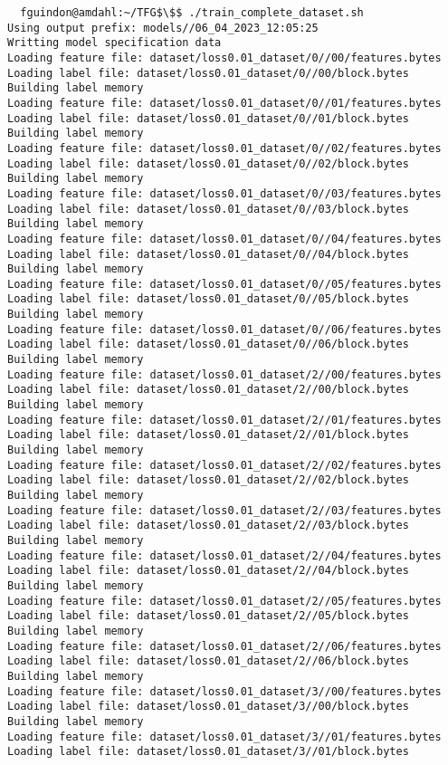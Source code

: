 \documentclass[12pt,oneside]{book}
\begin{document}
\begin{lstlisting}
  fguindon@amdahl:~/TFG$\$$ ./train_complete_dataset.sh
Using output prefix: models//06_04_2023_12:05:25
Writting model specification data
Loading feature file: dataset/loss0.01_dataset/0//00/features.bytes
Loading label file: dataset/loss0.01_dataset/0//00/block.bytes
Building label memory
Loading feature file: dataset/loss0.01_dataset/0//01/features.bytes
Loading label file: dataset/loss0.01_dataset/0//01/block.bytes
Building label memory
Loading feature file: dataset/loss0.01_dataset/0//02/features.bytes
Loading label file: dataset/loss0.01_dataset/0//02/block.bytes
Building label memory
Loading feature file: dataset/loss0.01_dataset/0//03/features.bytes
Loading label file: dataset/loss0.01_dataset/0//03/block.bytes
Building label memory
Loading feature file: dataset/loss0.01_dataset/0//04/features.bytes
Loading label file: dataset/loss0.01_dataset/0//04/block.bytes
Building label memory
Loading feature file: dataset/loss0.01_dataset/0//05/features.bytes
Loading label file: dataset/loss0.01_dataset/0//05/block.bytes
Building label memory
Loading feature file: dataset/loss0.01_dataset/0//06/features.bytes
Loading label file: dataset/loss0.01_dataset/0//06/block.bytes
Building label memory
Loading feature file: dataset/loss0.01_dataset/2//00/features.bytes
Loading label file: dataset/loss0.01_dataset/2//00/block.bytes
Building label memory
Loading feature file: dataset/loss0.01_dataset/2//01/features.bytes
Loading label file: dataset/loss0.01_dataset/2//01/block.bytes
Building label memory
Loading feature file: dataset/loss0.01_dataset/2//02/features.bytes
Loading label file: dataset/loss0.01_dataset/2//02/block.bytes
Building label memory
Loading feature file: dataset/loss0.01_dataset/2//03/features.bytes
Loading label file: dataset/loss0.01_dataset/2//03/block.bytes
Building label memory
Loading feature file: dataset/loss0.01_dataset/2//04/features.bytes
Loading label file: dataset/loss0.01_dataset/2//04/block.bytes
Building label memory
Loading feature file: dataset/loss0.01_dataset/2//05/features.bytes
Loading label file: dataset/loss0.01_dataset/2//05/block.bytes
Building label memory
Loading feature file: dataset/loss0.01_dataset/2//06/features.bytes
Loading label file: dataset/loss0.01_dataset/2//06/block.bytes
Building label memory
Loading feature file: dataset/loss0.01_dataset/3//00/features.bytes
Loading label file: dataset/loss0.01_dataset/3//00/block.bytes
Building label memory
Loading feature file: dataset/loss0.01_dataset/3//01/features.bytes
Loading label file: dataset/loss0.01_dataset/3//01/block.bytes

\end{lstlisting}
\end{document}
